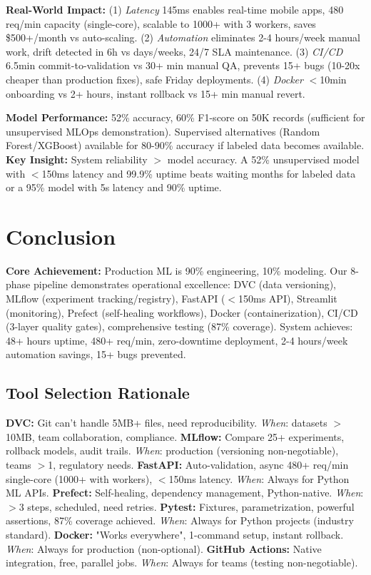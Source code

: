 \documentclass[11pt,a4paper]{article}
\begin{document}
\textbf{Real-World Impact:} (1) \textit{Latency} 145ms enables real-time mobile apps, 480 req/min capacity (single-core), scalable to 1000+ with 3 workers, saves \$500+/month vs auto-scaling. (2) \textit{Automation} eliminates 2-4 hours/week manual work, drift detected in 6h vs days/weeks, 24/7 SLA maintenance. (3) \textit{CI/CD} 6.5min commit-to-validation vs 30+ min manual QA, prevents 15+ bugs (10-20x cheaper than production fixes), safe Friday deployments. (4) \textit{Docker} $<$10min onboarding vs 2+ hours, instant rollback vs 15+ min manual revert.

\textbf{Model Performance:} 52\% accuracy, 60\% F1-score on 50K records (sufficient for unsupervised MLOps demonstration). Supervised alternatives (Random Forest/XGBoost) available for 80-90\% accuracy if labeled data becomes available. \textbf{Key Insight:} System reliability $>$ model accuracy. A 52\% unsupervised model with $<$150ms latency and 99.9\% uptime beats waiting months for labeled data or a 95\% model with 5s latency and 90\% uptime.

\section{Conclusion}

\textbf{Core Achievement:} Production ML is 90\% engineering, 10\% modeling. Our 8-phase pipeline demonstrates operational excellence: DVC (data versioning), MLflow (experiment tracking/registry), FastAPI ($<$150ms API), Streamlit (monitoring), Prefect (self-healing workflows), Docker (containerization), CI/CD (3-layer quality gates), comprehensive testing (87\% coverage). System achieves: 48+ hours uptime, 480+ req/min, zero-downtime deployment, 2-4 hours/week automation savings, 15+ bugs prevented.

\subsection{Tool Selection Rationale}

\textbf{DVC:} Git can't handle 5MB+ files, need reproducibility. \textit{When}: datasets $>$10MB, team collaboration, compliance. \textbf{MLflow:} Compare 25+ experiments, rollback models, audit trails. \textit{When}: production (versioning non-negotiable), teams $>$1, regulatory needs. \textbf{FastAPI:} Auto-validation, async 480+ req/min single-core (1000+ with workers), $<$150ms latency. \textit{When}: Always for Python ML APIs. \textbf{Prefect:} Self-healing, dependency management, Python-native. \textit{When}: $>$3 steps, scheduled, need retries. \textbf{Pytest:} Fixtures, parametrization, powerful assertions, 87\% coverage achieved. \textit{When}: Always for Python projects (industry standard). \textbf{Docker:} "Works everywhere", 1-command setup, instant rollback. \textit{When}: Always for production (non-optional). \textbf{GitHub Actions:} Native integration, free, parallel jobs. \textit{When}: Always for teams (testing non-negotiable).
\end{document}
